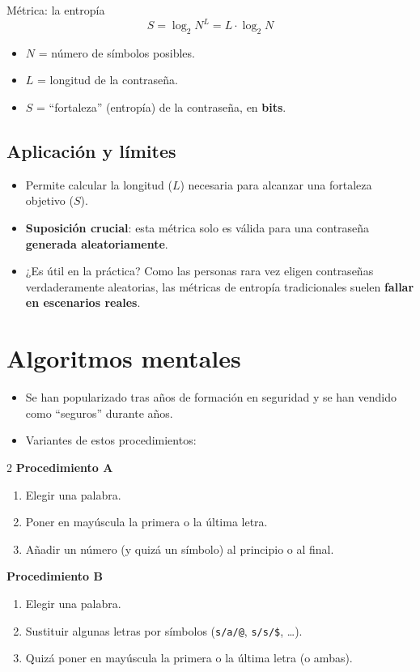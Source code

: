 \documentclass[11pt,a4paper]{report}
\newcommand{\destacar}[1]{\textcolor{red!70!black}{\textbf{#1}}}
\begin{document}
\begin{definicion}{Métrica: la entropía}
\[
S = \log_2 N^L = L \cdot \log_2 N
\]
\begin{itemize}
  \item $N$ = número de símbolos posibles.
  \item $L$ = longitud de la contraseña.
  \item $S$ = ``fortaleza'' (entropía) de la contraseña, en \textbf{bits}.
\end{itemize}
\end{definicion}
 
\subsection*{Aplicación y límites}
\begin{itemize}
  \item Permite calcular la longitud ($L$) necesaria para alcanzar una fortaleza objetivo ($S$).
  \item \destacar{Suposición crucial}: esta métrica solo es válida para una contraseña \textbf{generada aleatoriamente}.
  \item ¿Es útil en la práctica? Como las personas rara vez eligen contraseñas verdaderamente aleatorias, las métricas de entropía tradicionales suelen \textbf{fallar en escenarios reales}.
\end{itemize}
 
\section{Algoritmos mentales}
 
\begin{itemize}
  \item Se han popularizado tras años de formación en seguridad y se han vendido como ``seguros'' durante años.
  \item Variantes de estos procedimientos:
\end{itemize}
 
\begin{multicols}{2}
\textbf{Procedimiento A}
\begin{enumerate}
  \item Elegir una palabra.
  \item Poner en mayúscula la primera o la última letra.
  \item Añadir un número (y quizá un símbolo) al principio o al final.
\end{enumerate}
\columnbreak
\textbf{Procedimiento B}
\begin{enumerate}
  \item Elegir una palabra.
  \item Sustituir algunas letras por símbolos (\texttt{s/a/@}, \texttt{s/s/\$}, \ldots).
  \item Quizá poner en mayúscula la primera o la última letra (o ambas).
\end{enumerate}
\end{multicols}
 
\end{document}

